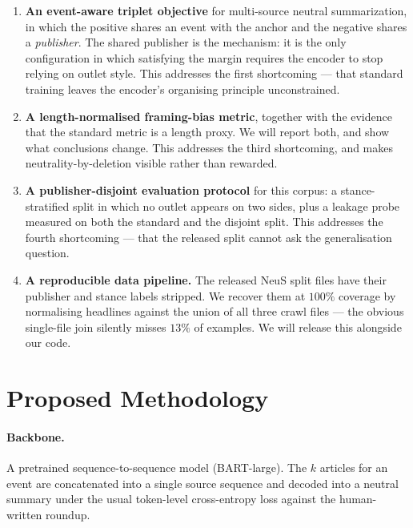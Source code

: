\documentclass[10pt,twocolumn,a4paper]{article}
\begin{document}
\begin{enumerate}\itemsep2pt
\item \textbf{An event-aware triplet objective} for multi-source neutral
summarization, in which the positive shares an event with the anchor and the
negative shares a \emph{publisher}. The shared publisher is the mechanism: it is
the only configuration in which satisfying the margin requires the encoder to
stop relying on outlet style. This addresses the first shortcoming --- that
standard training leaves the encoder's organising principle unconstrained.

\item \textbf{A length-normalised framing-bias metric}, together with the
evidence that the standard metric is a length proxy. We will report both, and
show what conclusions change. This addresses the third shortcoming, and makes
neutrality-by-deletion visible rather than rewarded.

\item \textbf{A publisher-disjoint evaluation protocol} for this corpus: a
stance-stratified split in which no outlet appears on two sides, plus a leakage
probe measured on both the standard and the disjoint split. This addresses the
fourth shortcoming --- that the released split cannot ask the generalisation
question.

\item \textbf{A reproducible data pipeline.} The released NeuS split files have
their publisher and stance labels stripped. We recover them at $100\%$ coverage
by normalising headlines against the union of all three crawl files --- the
obvious single-file join silently misses $13\%$ of examples. We will release
this alongside our code.
\end{enumerate}

\section{Proposed Methodology}

\paragraph{Backbone.} A pretrained sequence-to-sequence model (BART-large). The
$k$ articles for an event are concatenated into a single source sequence and
decoded into a neutral summary under the usual token-level cross-entropy loss
against the human-written roundup.
\end{document}
